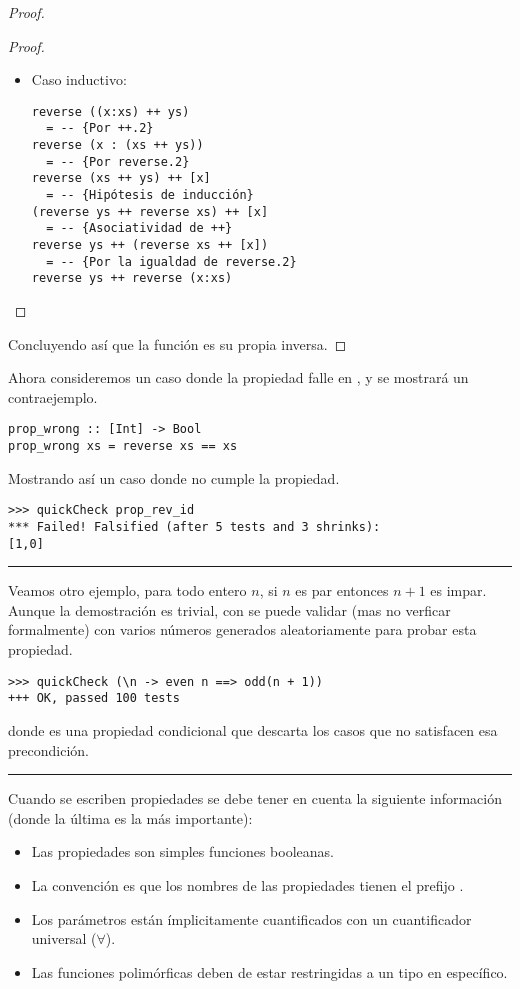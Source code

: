 \begin{proof}
\begin{proof}
\begin{itemize}
\item Caso inductivo:
\begin{verbatim}
reverse ((x:xs) ++ ys)
  = -- {Por ++.2}
reverse (x : (xs ++ ys))
  = -- {Por reverse.2}
reverse (xs ++ ys) ++ [x]
  = -- {Hipótesis de inducción}
(reverse ys ++ reverse xs) ++ [x]
  = -- {Asociatividad de ++}
reverse ys ++ (reverse xs ++ [x])
  = -- {Por la igualdad de reverse.2}
reverse ys ++ reverse (x:xs)
\end{verbatim}
\end{itemize}

\end{proof}

Concluyendo así que la función  es su propia inversa.
\end{proof}

Ahora consideremos un caso donde la propiedad falle en {\QuickCheck}, y se 
mostrará un contraejemplo.
\begin{verbatim}
prop_wrong :: [Int] -> Bool
prop_wrong xs = reverse xs == xs 
\end{verbatim}

Mostrando así un caso donde no cumple la propiedad.
\begin{verbatim}
>>> quickCheck prop_rev_id
*** Failed! Falsified (after 5 tests and 3 shrinks):
[1,0]
\end{verbatim}

\noindent\rule{\textwidth}{1pt}

Veamos otro ejemplo, para todo entero $n$, si $n$ es par entonces $n+1$ es 
impar. Aunque la demostración es trivial, con {\QuickCheck} se puede validar 
(mas no verficar formalmente) con varios números generados aleatoriamente para 
probar esta propiedad.
\begin{verbatim}
>>> quickCheck (\n -> even n ==> odd(n + 1))
+++ OK, passed 100 tests
\end{verbatim}
donde \hsCode{==>} es una propiedad condicional que descarta los casos que no 
satisfacen esa
precondición.

\noindent\rule{\textwidth}{1pt}

Cuando se escriben propiedades se debe tener en cuenta la siguiente información 
(donde la última es la más importante):
\begin{itemize}
\item Las propiedades son simples funciones booleanas.
\item La convención es que los nombres de las propiedades tienen el prefijo 
.
\item Los parámetros están ímplicitamente cuantificados con un cuantificador 
universal ($\forall$).
\item Las funciones polimórficas deben de estar restringidas a un tipo
en específico.
\end{itemize}


